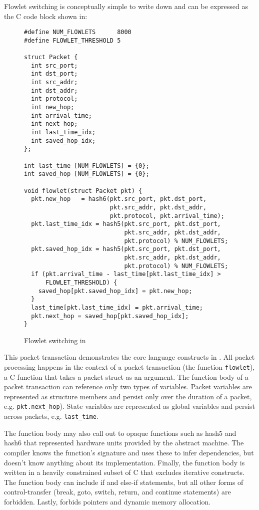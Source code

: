 Flowlet switching is conceptually simple to write down and can be expressed
as the C code block shown in:
\begin{figure}
\begin{small}
\begin{lstlisting}
#define NUM_FLOWLETS      8000
#define FLOWLET_THRESHOLD 5

struct Packet {
  int src_port;
  int dst_port;
  int src_addr;
  int dst_addr;
  int protocol;
  int new_hop;
  int arrival_time;
  int next_hop;
  int last_time_idx;
  int saved_hop_idx;
};

int last_time [NUM_FLOWLETS] = {0};
int saved_hop [NUM_FLOWLETS] = {0};

void flowlet(struct Packet pkt) {
  pkt.new_hop   = hash6(pkt.src_port, pkt.dst_port,
                        pkt.src_addr, pkt.dst_addr,
                        pkt.protocol, pkt.arrival_time);
  pkt.last_time_idx = hash5(pkt.src_port, pkt.dst_port,
                            pkt.src_addr, pkt.dst_addr,
                            pkt.protocol) % NUM_FLOWLETS;
  pkt.saved_hop_idx = hash5(pkt.src_port, pkt.dst_port,
                            pkt.src_addr, pkt.dst_addr,
                            pkt.protocol) % NUM_FLOWLETS;
  if (pkt.arrival_time - last_time[pkt.last_time_idx] >
      FLOWLET_THRESHOLD) {
    saved_hop[pkt.saved_hop_idx] = pkt.new_hop;
  }
  last_time[pkt.last_time_idx] = pkt.arrival_time;
  pkt.next_hop = saved_hop[pkt.saved_hop_idx];
}
\end{lstlisting}
\end{small}
\label{fig:flowlet}
\caption{Flowlet switching in \pktlanguage}
\end{figure}

This packet transaction demonstrates the core language constructs in
\pktlanguage. All packet processing happens in the context of a packet
transaction (the function \texttt{flowlet}), a C function that takes a packet
struct as an argument. The function body of a packet transaction can reference
only two types of variables. Packet variables are represented as structure
members and persist only over the duration of a packet, e.g.
\texttt{pkt.next\_hop}). State variables are represented as global variables
and persist across packets, e.g. \texttt{last\_time}.

The function body may also call out to opaque functions such as hash5 and hash6
that represented hardware units provided by the abstract machine. The
\pktlanguage compiler knows the function's signature and uses these to infer
dependencies, but doesn't know anything about its implementation. Finally, the
function body is written in a heavily constrained subset of C that excludes
iterative constructs. The function body can include if and else-if statements,
but all other forms of control-transfer (break, goto, switch, return, and
continue statements) are forbidden. Lastly, \pktlanguage forbids pointers and
dynamic memory allocation.

